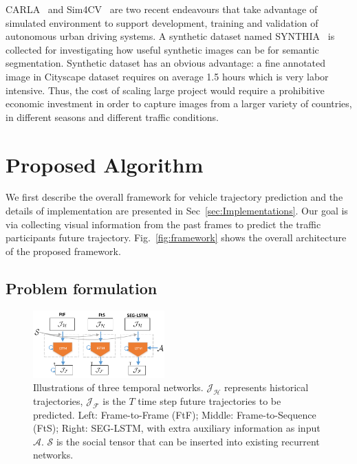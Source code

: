 \documentclass[10pt,twocolumn,letterpaper]{article}
\begin{document}
CARLA~\cite{CARLA} and Sim4CV~\cite{Sim4CV} are two recent endeavours that take advantage of simulated environment to support development, training and validation of autonomous urban driving systems.
A synthetic dataset named SYNTHIA~\cite{mueller2016benchmark} is collected for investigating how useful synthetic images can be for semantic segmentation.
Synthetic dataset has an obvious advantage: a fine annotated image in Cityscape dataset requires on average 1.5 hours which is very labor intensive. Thus, the cost of scaling large project would require a prohibitive economic investment in order to capture images from a larger variety of countries, in different seasons and different traffic conditions.

\section{Proposed Algorithm}

We first describe the overall framework for vehicle trajectory prediction and the details of implementation are presented in Sec~\ref{sec:Implementations}.
Our goal is via collecting visual information from the past frames to predict the traffic participants future trajectory. Fig.~\ref{fig:framework} shows the overall architecture of the proposed framework.

\subsection{Problem formulation}
\begin{figure}[t]
        \centering
        \includegraphics[width=0.45\textwidth]{figures/network_detail.pdf}
        \caption{
        \small{Illustrations of three temporal networks. $\mathcal{J_H}$ represents historical trajectories, $\mathcal{J_F}$ is the $T$ time step future trajectories to be predicted.  Left: Frame-to-Frame (FtF); Middle: Frame-to-Sequence (FtS); Right: SEG-LSTM, with extra auxiliary information as input $\mathcal{A}$. $\mathcal{S}$ is the social tensor that can be inserted into existing recurrent networks.}
        }
        \label{fig:lstm}
\end{figure}
\end{document}
